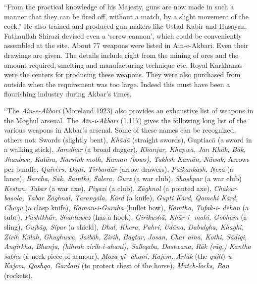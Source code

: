 ``From the practical knowledge of his Majesty, guns are now made in such a manner that they can be fired off, without a match, by a slight movement of the cock.” He also trained and produced gun makers like Ustad Kabir and Husayan. Fathaullah Shirazi devised even a ‘screw cannon’, which could be conveniently assembled at the site. About 77 weapons were listed in Ain-e-Akbari. Even their drawings are given. The details include right from the mining of ores and the amount required, smelting and manufacturing technique etc. Royal Karkhanas were the centers for producing these weapons. They were also purchased from outside when the requirement was too large. Indeed this must have been a flourishing industry during Akbar’s times.

“The {\it Ain-e-Akbari} (Moreland 1923) also provides an exhaustive list of weapons in the Moghul arsenal. The {\it Ain-i-Akbari} (1.117) gives the following long list of the various weapons in Akbar’s arsenal.  Some of these names can be recognized, others not: Swords (slightly bent), {\it Khādā} (straight swords), Guptiacā (a sword in a walking stick), {\it Jamdhar} (a broad dagger), {\it Khanjar, Khapwa, Jan Khāk, Bāk, Jhanbwa, Katāra, Narsink moth, Kaman (bows), Takhsh Kamān, Nāwak,} Arrows per bundle, {\it Quivers, Dadi, Tirbardār} (arrow drawers), {\it Paikankash, Neza} (a lance), {\it Barcha, Sāk, Sainthi, Salera, Gurz} (a war club), {\it Shashpar} (a war club) {\it Kestan, Tabar} (a war axe), {\it Piyazi} (a club), {\it Zāghnol} (a pointed axe), {\it Chakar- basola, Tabar Zāghnal, Tarangāla, Kārd} (a knife), {\it Gupti Kārd, Qamchi Kārd, Chaqu} (a clasp knife), {\it Kamān-i-Guraha} (bullet bow), {\it Kamtha, Tufak-i- dehan} (a tube), {\it Pushtkhār, Shahtawez} (has a hook), {\it Girikushā, Khār-i- mahi, Gobham} (a sling), {\it Gujbāg, Sipar} (a shield), {\it Dhal, Khera, Pahri, Udāna, Dabulgha, Khaghi, Zirih Kūlah, Ghughuwa, Jaibāh, Zirih,  Bagtar,  Josan, Char aina, Kothi, Sādiqi, Angirkha, Bhanju, (hihrah zirih-i-ahani), Salhqaba, Dastwana, Rāk (rāg,) Kantha sabha} (a neck piece of armour), {\it Moza yi- ahani, Kajem, Artak} (the {\it quilt}){\it -u-Kajem, Qashqa, Gardani} (to protect chest of the horse), {\it Match-locks, Ban} (rockets).

